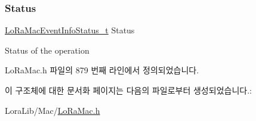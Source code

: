 \subsubsection{\texorpdfstring{Status}{Status}}
{\footnotesize\ttfamily \mbox{\hyperlink{group___l_o_r_a_m_a_c_gac6ffc346a4c767f7a743c87a686c51b4}{Lo\+Ra\+Mac\+Event\+Info\+Status\+\_\+t}} Status}

Status of the operation 

Lo\+Ra\+Mac.\+h 파일의 879 번째 라인에서 정의되었습니다.



이 구조체에 대한 문서화 페이지는 다음의 파일로부터 생성되었습니다.\+:\begin{DoxyCompactItemize}
\item 
Lora\+Lib/\+Mac/\mbox{\hyperlink{_lo_ra_mac_8h}{Lo\+Ra\+Mac.\+h}}\end{DoxyCompactItemize}
